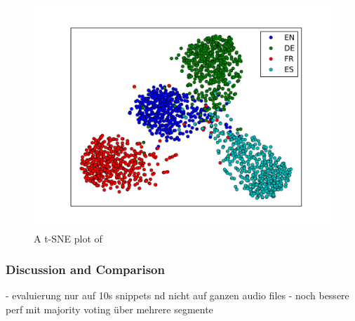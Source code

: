 	\begin{figure}[]
  		\centering
    	\includegraphics[width=\textwidth, keepaspectratio]{plots/tsne.pdf}
    	\caption{A t-SNE plot of }
    	\label{fig:tsne}
	\end{figure}

\subsubsection{Discussion and Comparison} 
\label{sec:comparison}

- evaluierung nur auf 10s snippets nd nicht auf ganzen audio files
- noch bessere perf mit majority voting über mehrere segmente
